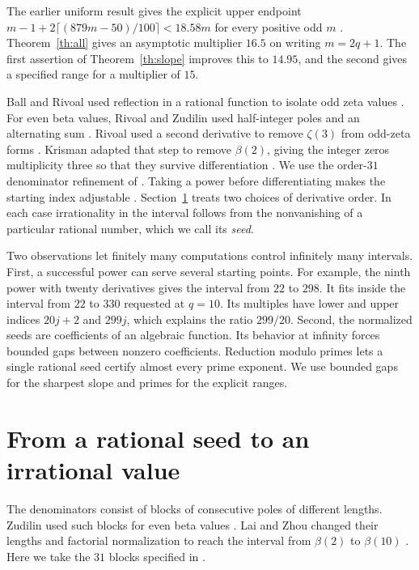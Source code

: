\documentclass[11pt]{article}
\numberwithin{equation}{section}
\begin{document}
The earlier uniform result gives the explicit upper endpoint
\(m-1+2\lceil(879m-50)/100\rceil<18.58m\) for every positive odd \(m\)
\cite[Proposition B.1]{shifted}. Theorem~\ref{th:all} gives an
asymptotic multiplier \(16.5\) on writing \(m=2q+1\).
The first assertion of Theorem~\ref{th:slope} improves this to \(14.95\),
and the second gives a specified range for a multiplier of \(15\).

Ball and Rivoal used reflection in a rational function to isolate odd
zeta values \cite[Section~1]{ballrivoal}. For even beta values,
Rivoal and Zudilin used half-integer poles and an alternating sum
\cite[Lemma~2]{rzbeta}. Rivoal used a second derivative to remove
\(\zeta(3)\) from odd-zeta forms \cite[Section~2, Lemma~1]{rivoal}.
Krisman adapted that step to remove \(\beta(2)\), giving the integer
zeros multiplicity three so that they survive differentiation
\cite[Section~1.2]{krisman}. We use the order-\(31\) denominator
refinement of \cite{fifteen}. Taking a power before differentiating
makes the starting index adjustable \cite{powered,two}.
Section~\ref{sec:fixed} treats two choices of derivative order. In each
case irrationality in the interval follows from the nonvanishing of
a particular rational number, which we call its \emph{seed}.

Two observations let finitely many computations control infinitely many
intervals. First, a successful power can serve several starting points.
For example, the ninth power with twenty derivatives gives the interval
from \(22\) to \(298\). It fits inside the interval from \(22\) to
\(330\) requested at \(q=10\). Its multiples have lower and upper
indices \(20j+2\) and \(299j\), which explains the ratio \(299/20\).
Second, the normalized seeds are coefficients of an algebraic function.
Its behavior at infinity forces bounded gaps between nonzero
coefficients. Reduction modulo primes lets a single rational seed
certify almost every prime exponent. We use bounded gaps for the
sharpest slope and primes for the explicit ranges.

\section{From a rational seed to an irrational value}\label{sec:fixed}

The denominators consist of blocks of consecutive poles of different
lengths. Zudilin used such blocks for even beta values
\cite[Section~3]{zudbeta}. Lai and Zhou changed their lengths and
factorial normalization to reach the interval from \(\beta(2)\) to
\(\beta(10)\) \cite[Theorem~6.1]{laizhou}. Here we take the \(31\)
blocks specified in \cite[Section~2]{fifteen}.
\end{document}
